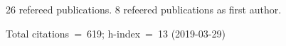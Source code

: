 26 refereed publications. 8 refeered publications as first author.

Total citations~=~619; h-index~=~13 (2019-03-29)
